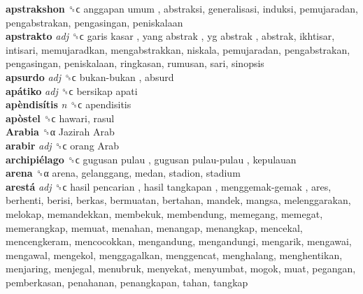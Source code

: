 \textbf{apstrakshon} ␝ϲ   anggapan umum , abstraksi, generalisasi, induksi, pemujaradan, pengabstrakan, pengasingan, peniskalaan  \\
\textbf{apstrakto} \emph{adj}  ␝ϲ   garis kasar ,  yang abstrak ,  yg abstrak , abstrak, ikhtisar, intisari, memujaradkan, mengabstrakkan, niskala, pemujaradan, pengabstrakan, pengasingan, peniskalaan, ringkasan, rumusan, sari, sinopsis  \\
\textbf{apsurdo} \emph{adj}  ␝ϲ   bukan-bukan , absurd  \\
\textbf{apátiko} \emph{adj}  ␝ϲ   bersikap apati   \\
\textbf{apèndisítis} \emph{n}  ␝ϲ  apendisitis  \\
\textbf{apòstel} ␝ϲ  hawari, rasul  \\
\textbf{Arabia} ␝α   Jazirah Arab   \\
\textbf{arabir} \emph{adj}  ␝ϲ   orang Arab   \\
\textbf{archipiélago} ␝ϲ   gugusan pulau ,  gugusan pulau-pulau , kepulauan  \\
\textbf{arena} ␝α  arena, gelanggang, medan, stadion, stadium  \\
\textbf{arestá} \emph{adj}  ␝ϲ   hasil pencarian ,  hasil tangkapan ,  menggemak-gemak , ares, berhenti, berisi, berkas, bermuatan, bertahan, mandek, mangsa, melenggarakan, melokap, memandekkan, membekuk, membendung, memegang, memegat, memerangkap, memuat, menahan, menangap, menangkap, mencekal, mencengkeram, mencocokkan, mengandung, mengandungi, mengarik, mengawai, mengawal, mengekol, menggagalkan, menggencat, menghalang, menghentikan, menjaring, menjegal, menubruk, menyekat, menyumbat, mogok, muat, pegangan, pemberkasan, penahanan, penangkapan, tahan, tangkap  \\
